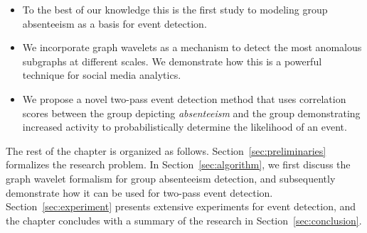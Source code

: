 \begin{itemize}
\item To the best of our knowledge this is the first study to modeling group absenteeism as a basis for event detection.

\item We incorporate graph wavelets as a mechanism to detect the most anomalous subgraphs at different scales. We demonstrate how this is a powerful technique for social media analytics.

\item We propose a novel two-pass event detection method that uses correlation scores between the group depicting \textit{absenteeism} and the group demonstrating increased activity to probabilistically determine the likelihood of an event.
\end{itemize}

The rest of the chapter is organized as follows. 
Section~\ref{sec:preliminaries} formalizes the research problem. In Section~\ref{sec:algorithm}, we first discuss the graph wavelet formalism for group absenteeism detection, and subsequently demonstrate how it can be used for two-pass event detection. Section~\ref{sec:experiment} presents extensive experiments for event detection, and the chapter concludes with a summary of the research in Section~\ref{sec:conclusion}.



